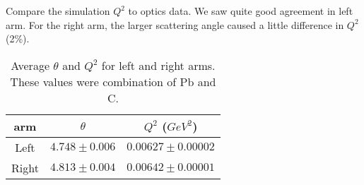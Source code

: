 \begin{comment}
I am doubting if I was comparing the same thing. 
In data, $Q^2$ was calculated as:
$$ Q^2 = 2*beamE*P*(1-\cos(\theta))$$
where beamE was the average beam energy (before hitting the target), 
and P was the reconstructed beam energy, or post-target energy 
and $\theta$ was the reconstructed scattering angle 

But in simulation, $Q^2$ was calculated as:
$$ Q^2 = 2*E*Ef*(1-\cos(\theta)) $$
where E was the post vertex beam energy: I made a mistake here, E should be 
pre-vertex beam energy.
$$ Ef = M*E/(M + E*(1-cos(th))) $$
was the theorectical beam energy after elastic scattering and $\theta$ was 
the scattering angle.

Obviously, data and simulation had different definitions:
$$ beamE > E	\quad P < E	\quad P \stacker{?}{\sim} $$
The only good news was that beamE, E, P, Ef were all close to each other. Overall,
the simulation would make the simulation $Q^2$ smaller than that of data. Not
sure how large the uncertainty was.

The only difference here for vertex and post-vertex was the scattering angle,
one was the vertex angle and the other being the post-target scattering angle.

The CREX analysis was comparing the same thing.
\end{comment}

Compare the simulation $Q^2$ to optics data. We saw quite good agreement in left
arm. For the right arm, the larger scattering angle caused a little difference
in $Q^2$ (2\%).
\begin{table}
    \centering
    \begin{tabular}{c | c c}
	\hline
	arm & $\theta$	& $Q^2$ ($GeV^2$)   \\
	\hline
	Left	& $4.748 \pm 0.006$ & $0.00627 \pm 0.00002$	\\
	Right	& $4.813 \pm 0.004$ & $0.00642 \pm 0.00001$	\\
	\hline
    \end{tabular}
    \caption{Average $\theta$ and $Q^2$ for left and right arms. These values were
    combination of Pb and C.}
    \label{tab:prex_C_contam_Q2}
\end{table}

